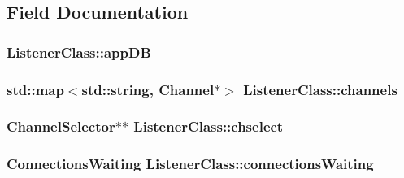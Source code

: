 \subsection{\-Field \-Documentation}
\hypertarget{classListenerClass_ab12f05f1fd420de2c5af04a7ecbeba4d}{
\subsubsection[{app\-D\-B}]{ {\bf \-Listener\-Class\-::app\-D\-B}}}\label{classListenerClass_ab12f05f1fd420de2c5af04a7ecbeba4d}
\hypertarget{classListenerClass_a117b3a05516645559a9d2ebfc59e402d}{
\subsubsection[{channels}]{\setlength{\rightskip}{0pt plus 5cm}std\-::map$<$std\-::string, \-Channel$\ast$$>$ {\bf \-Listener\-Class\-::channels}}}\label{classListenerClass_a117b3a05516645559a9d2ebfc59e402d}
\hypertarget{classListenerClass_a464fae6bbe88763173d475959707a9ce}{
\subsubsection[{chselect}]{\setlength{\rightskip}{0pt plus 5cm}\-Channel\-Selector$\ast$$\ast$ {\bf \-Listener\-Class\-::chselect}}}\label{classListenerClass_a464fae6bbe88763173d475959707a9ce}
\hypertarget{classListenerClass_a042f0c9bc8ae4ea89fdf667cac503362}{
\subsubsection[{connections\-Waiting}]{\setlength{\rightskip}{0pt plus 5cm}\-Connections\-Waiting {\bf \-Listener\-Class\-::connections\-Waiting}}}\label{classListenerClass_a042f0c9bc8ae4ea89fdf667cac503362}
